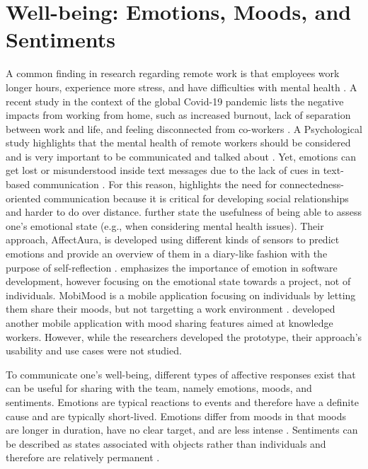 \section{Well-being: Emotions, Moods, and Sentiments}
A common finding in research regarding remote work is that employees work longer hours, experience more stress, and have difficulties with mental health \autocite{mswellbeing, mulki2009set, qualtricksmental}. A recent study in the context of the global Covid-19 pandemic lists the negative impacts from working from home, such as increased burnout, lack of separation between work and life, and feeling disconnected from co-workers \autocite{mswellbeing}. A Psychological study highlights that the mental health of remote workers should be considered and is very important to be communicated and talked about \autocite{grant2013exploration}. Yet, emotions can get lost or misunderstood inside text messages due to the lack of cues in text-based communication \autocite{hook2008interactional}. For this reason, \textcite{kuwabara2002connectedness} highlights the need for connectedness-oriented communication because it is critical for developing social relationships and harder to do over distance. \textcite{mcduff2012affectaura} further state the usefulness of being able to assess one's emotional state (e.g., when considering mental health issues). Their approach, AffectAura, is developed using different kinds of sensors to predict emotions and provide an overview of them in a diary-like fashion with the purpose of self-reflection \autocite{dullemond2013fixing}. \textcite{guzman2013towards} emphasizes the importance of emotion in software development, however focusing on the emotional state towards a project, not of individuals. MobiMood is a mobile application focusing on individuals by letting them share their moods, but not targetting a work environment \autocite{church2010study}. \textcite{saari2008mobile} developed another mobile application with mood sharing features aimed at knowledge workers. However, while the researchers developed the prototype, their approach's usability and use cases were not studied.



To communicate one's well-being, different types of affective responses exist that can be useful for sharing with the team, namely emotions, moods, and sentiments. Emotions are typical reactions to events and therefore have a definite cause and are typically short-lived. Emotions differ from moods in that moods are longer in duration, have no clear target, and are less intense \autocite{frijda1994varieties, brave2007emotion}. Sentiments can be described as states associated with objects rather than individuals and therefore are relatively permanent \autocite{brave2007emotion}.

